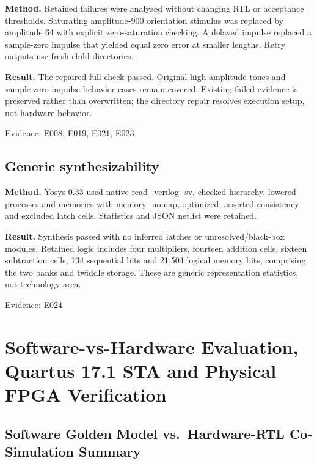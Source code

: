 \documentclass[11pt,a4paper]{article}
\begin{document}
\textbf{Method.} Retained failures were analyzed without changing RTL or acceptance thresholds. Saturating amplitude-900 orientation stimulus was replaced by amplitude 64 with explicit zero-saturation checking. A delayed impulse replaced a sample-zero impulse that yielded equal zero error at smaller lengths. Retry outputs use fresh child directories.

\textbf{Result.} The repaired full check passed. Original high-amplitude tones and sample-zero impulse behavior cases remain covered. Existing failed evidence is preserved rather than overwritten; the directory repair resolves execution setup,\allowbreak{} not hardware behavior.

{\small Evidence: E008,\allowbreak{} E019,\allowbreak{} E021,\allowbreak{} E023}

\subsection{Generic synthesizability}

\textbf{Method.} Yosys 0.33 used native read\_\allowbreak{}verilog -sv,\allowbreak{} checked hierarchy,\allowbreak{} lowered processes and memories with memory -nomap,\allowbreak{} optimized,\allowbreak{} asserted consistency and excluded latch cells. Statistics and JSON netlist were retained.

\textbf{Result.} Synthesis passed with no inferred latches or unresolved/\allowbreak{}black-box modules. Retained logic includes four multipliers,\allowbreak{} fourteen addition cells,\allowbreak{} sixteen subtraction cells,\allowbreak{} 134 sequential bits and 21,\allowbreak{}504 logical memory bits,\allowbreak{} comprising the two banks and twiddle storage. These are generic representation statistics,\allowbreak{} not technology area.

{\small Evidence: E024}

\section{Software-vs-Hardware Evaluation, Quartus 17.1 STA and Physical FPGA Verification}

\subsection{Software Golden Model vs.\ Hardware-RTL Co-Simulation Summary}
\end{document}
